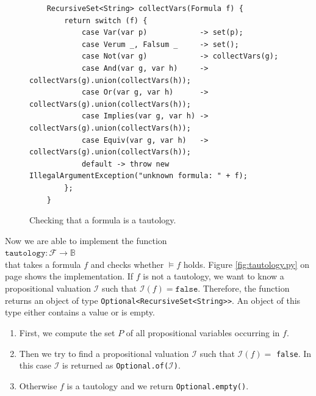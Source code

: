 \begin{figure}[!ht]
  \centering
\begin{verbatim}
    RecursiveSet<String> collectVars(Formula f) {
        return switch (f) {
            case Var(var p)            -> set(p);
            case Verum _, Falsum _     -> set();
            case Not(var g)            -> collectVars(g);
            case And(var g, var h)     -> collectVars(g).union(collectVars(h));
            case Or(var g, var h)      -> collectVars(g).union(collectVars(h));
            case Implies(var g, var h) -> collectVars(g).union(collectVars(h));
            case Equiv(var g, var h)   -> collectVars(g).union(collectVars(h));
            default -> throw new IllegalArgumentException("unknown formula: " + f);
        };
    }
\end{verbatim}
\vspace*{-0.3cm}
  \caption{Checking that a formula is a tautology.}
  \label{fig:tautology.py-collectVars}
\end{figure}

Now we are able to implement the function 
\\[0.2cm]
\hspace*{1.3cm}
$\mathtt{tautology}: \mathcal{F} \rightarrow \mathbb{B}$
\\[0.2cm]
that takes a formula $f$ and checks whether $\models f$ holds.
Figure \ref{fig:tautology.py} on page \pageref{fig:tautology.py}
shows the implementation.  If $f$ is not a tautology, we want to know a propositional valuation
$\mathcal{I}$ such that $\mathcal{I}(f) = \texttt{false}$.  Therefore, the function returns an object of type
\texttt{Optional<RecursiveSet<String>{}>}.  An object of this type either contains a value or is empty.
\begin{enumerate}
\item First, we compute the set $P$ of all propositional variables occurring in $f$.
\item Then we try to find a propositional valuation $\mathcal{I}$ such that $\mathcal{I}(f) =$
      \texttt{false}.  In this case $\mathcal{I}$ is returned as \texttt{Optional.of($\mathcal{I}$)}. 
\item Otherwise $f$ is a tautology and we return \texttt{Optional.empty()}.
\end{enumerate}

